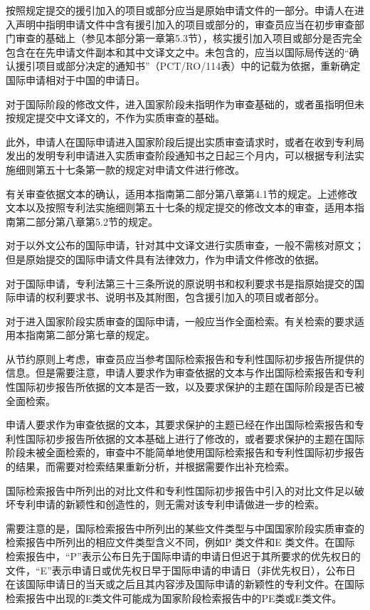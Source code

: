 按照规定提交的援引加入的项目或部分应当是原始申请文件的一部分。申请人在进入声明中指明申请文件中含有援引加入的项目或部分的，审查员应当在初步审查部门审查的基础上（参见本部分第一章第5.3节），核实援引加入项目或部分是否完全包含在在先申请文件副本和其中文译文之中。未包含的，应当以国际局传送的“确认援引项目或部分决定的通知书”（PCT/RO/114表）中的记载为依据，重新确定国际申请相对于中国的申请日。

对于国际阶段的修改文件，进入国家阶段未指明作为审查基础的，或者虽指明但未按规定提交中文译文的，不作为实质审查的基础。

此外，申请人在国际申请进入国家阶段后提出实质审查请求时，或者在收到专利局发出的发明专利申请进入实质审查阶段通知书之日起三个月内，可以根据专利法实施细则第五十七条第一款的规定对申请文件进行修改。

有关审查依据文本的确认，适用本指南第二部分第八章第4.1节的规定。上述修改文本以及按照专利法实施细则第五十七条的规定提交的修改文本的审查，适用本指南第二部分第八章第5.2节的规定。

对于以外文公布的国际申请，针对其中文译文进行实质审查，一般不需核对原文；但是原始提交的国际申请文件具有法律效力，作为申请文件修改的依据。

对于国际申请，专利法第三十三条所说的原说明书和权利要求书是指原始提交的国际申请的权利要求书、说明书及其附图，包含援引加入的项目或者部分。

对于进入国家阶段实质审查的国际申请，一般应当作全面检索。有关检索的要求适用本指南第二部分第七章的规定。

从节约原则上考虑，审查员应当参考国际检索报告和专利性国际初步报告所提供的信息。但是需要注意，申请人要求作为审查依据的文本与作出国际检索报告和专利性国际初步报告所依据的文本是否一致，以及要求保护的主题在国际阶段是否已被全面检索。

申请人要求作为审查依据的文本，其要求保护的主题已经在作出国际检索报告和专利性国际初步报告所依据的文本基础上进行了修改的，或者要求保护的主题在国际阶段未被全面检索的，审查中不能简单地使用国际检索报告和专利性国际初步报告的结果，而需要对检索结果重新分析，并根据需要作出补充检索。

国际检索报告中所列出的对比文件和专利性国际初步报告中引入的对比文件足以破坏专利申请的新颖性和创造性的，则无需对该专利申请做进一步的检索。

需要注意的是，国际检索报告中所列出的某些文件类型与中国国家阶段实质审查的检索报告中所列出的相应文件类型含义不同，例如P 类文件和E 类文件。在国际检索报告中，“P”表示公布日先于国际申请的申请日但迟于其所要求的优先权日的文件，“E”表示申请日或优先权日早于国际申请的申请日（非优先权日），公布日在该国际申请日的当天或之后且其内容涉及国际申请的新颖性的专利文件。在国际检索报告中出现的E类文件可能成为国家阶段检索报告中的PE类或E类文件。

